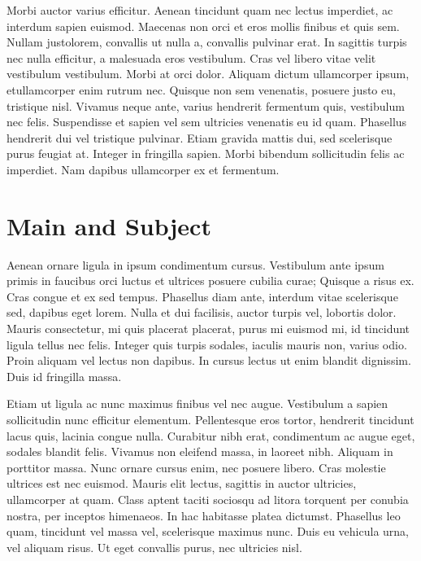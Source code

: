 \documentclass[12pt,a4paper]{article}
\begin{document}
\switchlinenumbers
Morbi auctor varius efficitur. Aenean tincidunt quam nec lectus imperdiet, ac interdum sapien euismod. Maecenas non orci et eros mollis finibus et quis sem. Nullam justo\pleasecite lorem, convallis ut nulla a, convallis pulvinar erat. In sagittis turpis nec nulla efficitur, a malesuada eros vestibulum. Cras vel libero vitae velit vestibulum vestibulum. Morbi at orci dolor. Aliquam dictum ullamcorper ipsum, et ullamcorper enim rutrum nec. Quisque non sem venenatis, posuere justo eu, tristique nisl. Vivamus neque ante, varius hendrerit fermentum quis, vestibulum nec felis. Suspendisse et sapien vel sem ultricies venenatis eu id quam. Phasellus hendrerit dui vel tristique pulvinar. Etiam gravida mattis dui, sed scelerisque purus feugiat at. Integer in fringilla sapien. Morbi bibendum sollicitudin felis ac imperdiet. Nam dapibus ullamcorper ex et fermentum.

\section{Main and Subject}

\leftlinenumbers

 Aenean ornare ligula in ipsum condimentum cursus. Vestibulum ante ipsum primis in faucibus orci luctus et ultrices posuere cubilia curae; Quisque a risus ex. Cras congue et ex sed tempus. Phasellus diam ante, interdum vitae scelerisque sed, dapibus eget lorem. Nulla et dui facilisis, auctor turpis vel, lobortis dolor. Mauris consectetur, mi quis placerat placerat, purus mi euismod mi, id tincidunt ligula tellus nec felis. Integer quis turpis sodales, iaculis mauris non, varius odio. Proin aliquam vel lectus non dapibus. In cursus lectus ut enim blandit dignissim. Duis id fringilla massa.

 Etiam ut ligula ac nunc maximus finibus vel nec augue. Vestibulum a sapien sollicitudin nunc efficitur elementum. Pellentesque eros tortor, hendrerit tincidunt lacus quis, lacinia congue nulla. Curabitur nibh erat, condimentum ac augue eget, sodales blandit felis. Vivamus non eleifend massa, in laoreet nibh. Aliquam in porttitor massa. Nunc ornare cursus enim, nec posuere libero. Cras molestie ultrices est nec euismod. Mauris elit lectus, sagittis in auctor ultricies, ullamcorper at quam. Class aptent taciti sociosqu ad litora torquent per conubia nostra, per inceptos himenaeos. In hac habitasse platea dictumst. Phasellus leo quam, tincidunt vel massa vel, scelerisque maximus nunc. Duis eu vehicula urna, vel aliquam risus. Ut eget convallis purus, nec ultricies nisl.
\rightlinenumbers
\end{document}
